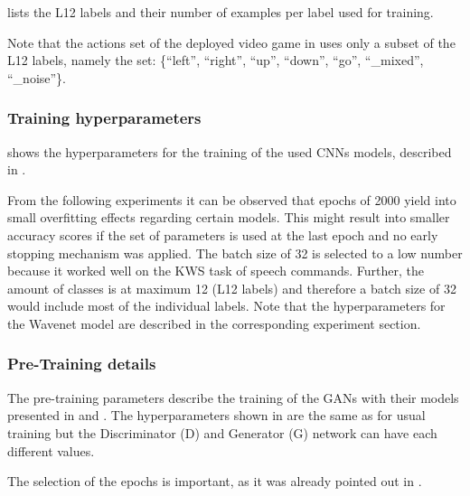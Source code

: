  lists the L12 labels and their number of examples per label used for training.

Note that the actions set of the deployed video game in  uses only a subset of the L12 labels, namely the set: \{\enquote{left},  \enquote{right}, \enquote{up}, \enquote{down}, \enquote{go}, \enquote{\_mixed}, \enquote{\_noise}\}.



\subsubsection{Training hyperparameters}
 shows the hyperparameters for the training of the used CNNs models, described in .

From the following experiments it can be observed that epochs of 2000 yield into small overfitting effects regarding certain models.
This might result into smaller accuracy scores if the set of parameters is used at the last epoch and no early stopping mechanism was applied.
The batch size of 32 is selected to a low number because it worked well on the KWS task of speech commands.
Further, the amount of classes is at maximum 12 (L12 labels) and therefore a batch size of 32 would include most of the individual labels.
Note that the hyperparameters for the Wavenet model are described in the corresponding experiment section.



\subsubsection{Pre-Training details}
The pre-training parameters describe the training of the GANs with their models presented in  and .
The hyperparameters shown in  are the same as for usual training but the Discriminator (D) and Generator (G) network can have each different values.

The selection of the epochs is important, as it was already pointed out in .



